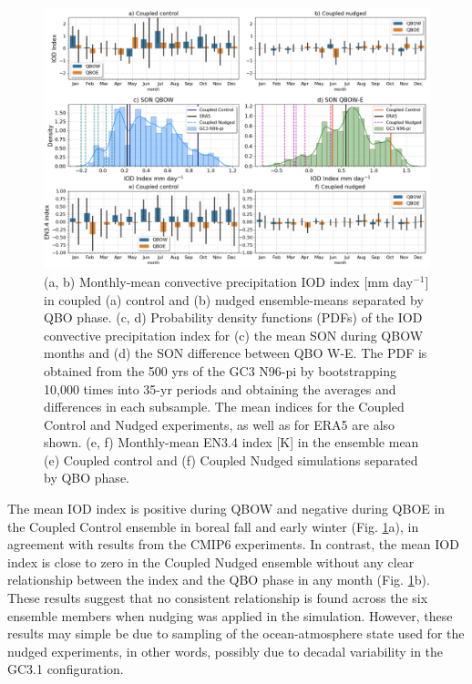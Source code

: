 \begin{figure}[t!]
\centering
 \includegraphics[width=\linewidth]{figures/iod_suites.png}
\caption[IOD and ENSO indices in nudged versus control experiments]{(a, b) Monthly-mean convective precipitation IOD index [mm day$^{-1}$] in coupled (a) control and (b) nudged ensemble-means separated by QBO phase. (c, d) Probability density functions (PDFs) of the IOD convective precipitation index for (c) the mean SON during QBOW months and (d) the SON difference between QBO W-E. The PDF is obtained from the 500 yrs of the GC3 N96-pi by bootstrapping 10,000 times into 35-yr periods and obtaining the averages and differences in each subsample. The mean indices for the Coupled Control and Nudged experiments, as well as for ERA5 are also shown. (e, f) Monthly-mean EN3.4 index [K] in the ensemble mean (e) Coupled control and (f) Coupled Nudged simulations separated by QBO phase.   }
\label{fig:iod_suites}
\end{figure}

The mean IOD index is positive during QBOW and negative during QBOE in the Coupled Control ensemble in boreal fall and early winter (Fig. \ref{fig:iod_suites}a), in agreement with results from the CMIP6 experiments. In contrast, the mean IOD index is close to zero in the Coupled Nudged ensemble without any clear relationship between the index and the QBO phase in any month (Fig. \ref{fig:iod_suites}b). 
These results suggest that no consistent relationship is found across the six ensemble members when nudging was applied in the simulation. 
However, these results may simple be due to sampling of the ocean-atmosphere state used for the nudged experiments, in other words, possibly due to decadal variability in the GC3.1 configuration.

